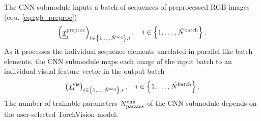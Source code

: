 The CNN submodule inputs
a batch of sequences of preprocessed RGB images 
(equ. \ref{eq:rgb_preproc}) 
\begin{equation}
    \left({}_{}^{} {\underline{\underline{\underline x}}}^{\text{preproc}}_{t}\right)_{t \in \left\{ 1, \dots, {}_{}^{} \breve{N}^{\text{seq}}_{} \right\}, i}
    ,\quad 
    i \in \left\{ 1, \dots, {}_{}^{} \breve{N}^{\text{batch}}_{} \right\}.
\end{equation}
As it processes the individual sequence elements 
unrelated in parallel like batch elements,
the CNN submodule maps each image of the input batch 
to an individual visual feature vector in the output batch
\begin{equation} \label{eq:cnn_output}
    \left({}_{}^{} {\underline x}^{\text{vis}}_{t}\right)_{t \in \left\{ 1, \dots, {}_{}^{} \breve{N}^{\text{seq}}_{} \right\}, i}
    ,\quad 
    i \in \left\{ 1, \dots, {}_{}^{} \breve{N}^{\text{batch}}_{} \right\}.
\end{equation}
The number of trainable parameters ${}_{}^{} {N}^{\text{cnn}}_{\text{params}}$ of the CNN submodule 
depends on the user-selected TorchVision model.




